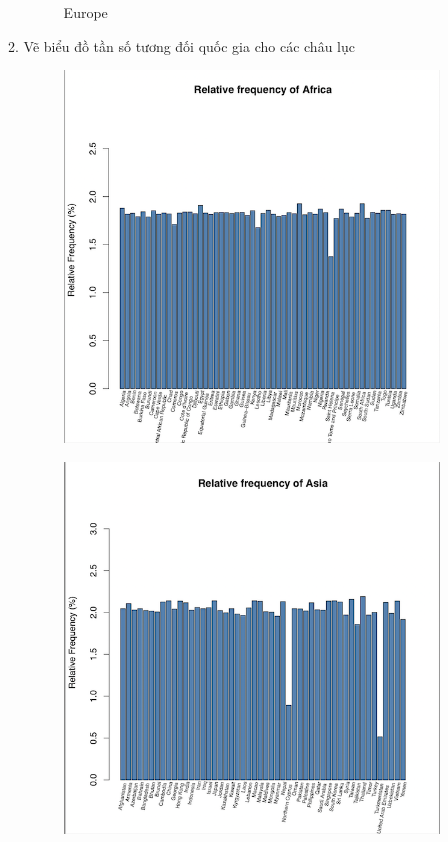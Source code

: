 \documentclass[a4paper]{article}
\theoremstyle{definition}
\begin{document}
\begin{enumerate}[i)]
\begin{enumerate}[1]
\begin{figure}[H]
			\vspace{5mm}
			\caption{Europe}
		\end{figure}
			\item Vẽ biểu đồ tần số tương đối quốc gia cho các châu lục
			\begin{figure}[H]
				\centering
				\includegraphics[scale=0.8]{images/4.2.1.png}
			\end{figure}
			\begin{figure}[H]
				\centering
				\includegraphics[scale=0.8]{images/4.2.2.png}

\end{figure}
\end{enumerate}
\end{enumerate}
\end{document}
